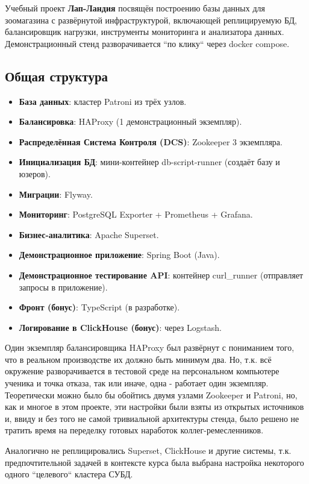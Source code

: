 Учебный проект \textbf{Лап-Ландия} посвящён построению базы данных для зоомагазина с развёрнутой инфраструктурой,
включающей реплицируемую БД, балансировщик нагрузки,
инструменты мониторинга и анализатора данных.
Демонстрационный стенд разворачивается ``по клику`` через docker compose.

\subsection{Общая структура}\label{subsec:-generalstructure:-}

\begin{itemize}
    \item \textbf{База данных}: кластер Patroni из трёх узлов.
    \item \textbf{Балансировка}: HAProxy (1 демонстрационный экземпляр).
    \item \textbf{Распределённая Система Контроля (DCS)}: Zookeeper 3 экземпляра.
    \item \textbf{Инициализация БД}: мини-контейнер db-script-runner (создаёт базу и юзеров).
    \item \textbf{Миграции}: Flyway.
    \item \textbf{Мониторинг}: PostgreSQL Exporter + Prometheus + Grafana.
    \item \textbf{Бизнес-аналитика}: Apache Superset.
    \item \textbf{Демонстрационное приложение}: Spring Boot (Java).
    \item \textbf{Демонстрационное тестирование API}: контейнер curl\_runner (отправляет запросы в приложение).
    \item \textbf{Фронт (бонус)}: TypeScript (в разработке).
    \item \textbf{Логирование в ClickHouse (бонус)}: через Logstash.
\end{itemize}

Один экземпляр балансировщика HAProxy был развёрнут с пониманием того, что в реальном производстве их должно быть
минимум два.
Но, т.к. всё окружение разворачивается в тестовой среде на персональном компьютере ученика и точка отказа, так или
иначе, одна - работает один экземпляр.
Теоретически можно было бы обойтись двумя узлами Zookeeper и Patroni, но, как и многое в этом проекте, эти настройки
были взяты из открытых источников и, ввиду и без того не самой тривиальной архитектуры стенда, было решено
не тратить время на переделку готовых наработок коллег-ремесленников.

Аналогично не реплицировались Superset, ClickHouse и другие системы, т.к. предпочтительной задачей в контексте курса
была выбрана настройка некоторого одного ``целевого`` кластера СУБД.

